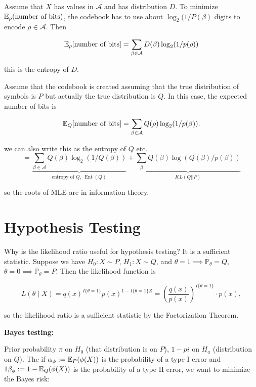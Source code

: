 \begin{theorem}

Assume that \(X\) has values in \(\mathcal{A}\) and has distribution \(D\). To minimize \(\E_\rho ( \text{number of bits})\), the codebook has to use about \( \log_2 (1 / P(\beta)\) digits to encode \(\rho \in \mathcal{A}\). Then

\[
\E_\rho [ \text{number of bits}] = \sum_{\beta \in \mathcal{A}} D(\beta) \log_2 (1 / p(\rho)) 
\]

this is the entropy of \(D\).

Assume that the codebook is created assuming that the true distribution of symbols is \(P\) but actually the true distribution is \(Q\). In this case, the expected number of bits is

\[
\E_Q  [ \text{number of bits}] = \sum_{\beta \in \mathcal{A}} Q(\rho) \log_2 (1/ p(\beta)).
\]

we can also write this as the entropy of \(Q\) etc.
\[
= \underbrace{\sum_{\beta \in \mathcal{A}} Q(\beta) \log_2(1 / Q(\beta))}_{\text{entropy of } Q, \ \operatorname{Ent}(Q)} 
+ \underbrace{\sum_\beta Q(\beta) \log (Q(\beta)/ p(\beta)) }_{KL(Q || P)}
\]

so the roots of MLE are in information theory.

\end{theorem}

\section{Hypothesis Testing}

Why is the likelihood ratio useful for hypothesis testing? It is a sufficient statistic. Suppose we have \(H_0: X \sim P\), \(H_1: X \sim Q\), and \(\theta = 1 \implies \mathbb{P}_\theta = Q\), \(\theta = 0 \implies \mathbb{P}_\theta = P\). Then the likelihood function is

\[
L(\theta \mid X) = q(x)^{I\{ \theta = 1\}} p(x)^{1 - I\{\theta = 1\}Z} = \left( \frac{q(x)}{p(x)} \right)^{I\{\theta = 1\}} \cdot p(x),
\]

so the likelihood ratio is a sufficient statistic by the Factorization Theorem.

\textbf{Bayes testing:}

Prior probability \(\pi\) on \(H_0\) (that distribution is on \(P\)), \(1-pi\) on \(H_a\) (distribution on \(Q\)). The if \(\alpha_\phi := \E_P (\phi(X))\) is the probability of a type I error and \(1 \beta_\phi := 1 - \E_Q(\phi(X))\) is the probability of a type II error, we want to minimize the Bayes risk:

